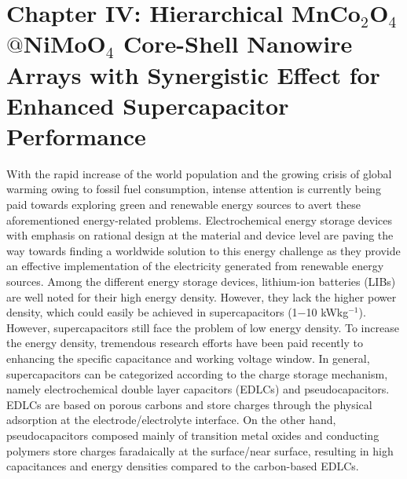 \documentclass[reprint,amsmath,amssymb,aps,floatfix,
]{revtex4-2}
\begin{document}
\section*{\label{sec:level1}C\lowercase{hapter} IV: H\lowercase{ierarchical} M\lowercase{n}C\lowercase{o}$_2$O$_4$$@$N\lowercase{i}M\lowercase{o}O$_4$ C\lowercase{ore-}S\lowercase{hell} N\lowercase{anowire} A\lowercase{rrays with} S\lowercase{ynergistic} E\lowercase{ffect for} E\lowercase{nhanced} S\lowercase{upercapacitor} P\lowercase{erformance}}
With the rapid increase of the world population and the growing crisis of global warming owing to fossil fuel consumption, intense attention is currently being paid towards exploring green and renewable energy sources to avert these aforementioned energy-related problems.\cite{Ronald2011} Electrochemical energy storage devices with emphasis on rational design at the material and device level are paving the way towards finding a worldwide solution to this energy challenge as they provide an effective implementation of the electricity generated from renewable energy sources.\cite{Zhonghua2017} Among the different energy storage devices, lithium-ion batteries (LIBs) are well noted for their high energy density.\cite{Gogotsi2018} However, they lack the higher power density, which could easily be achieved in supercapacitors (1$-$10 kWkg$^{-1}$).\cite{Wang2012} However, supercapacitors still face the problem of low energy density.\cite{Xin2018} To increase the energy density, tremendous research efforts have been paid recently to enhancing the specific capacitance and working voltage window. In general, supercapacitors can be categorized according to the charge storage mechanism, namely electrochemical double layer capacitors (EDLCs) and pseudocapacitors. EDLCs are based on porous carbons and store charges through the physical adsorption at the electrode/electrolyte interface. On the other hand, pseudocapacitors composed mainly of transition metal oxides and conducting polymers store charges faradaically at the surface/near surface, resulting in high capacitances and energy densities compared to the carbon-based EDLCs.\cite{Andrew2011}
\end{document}
